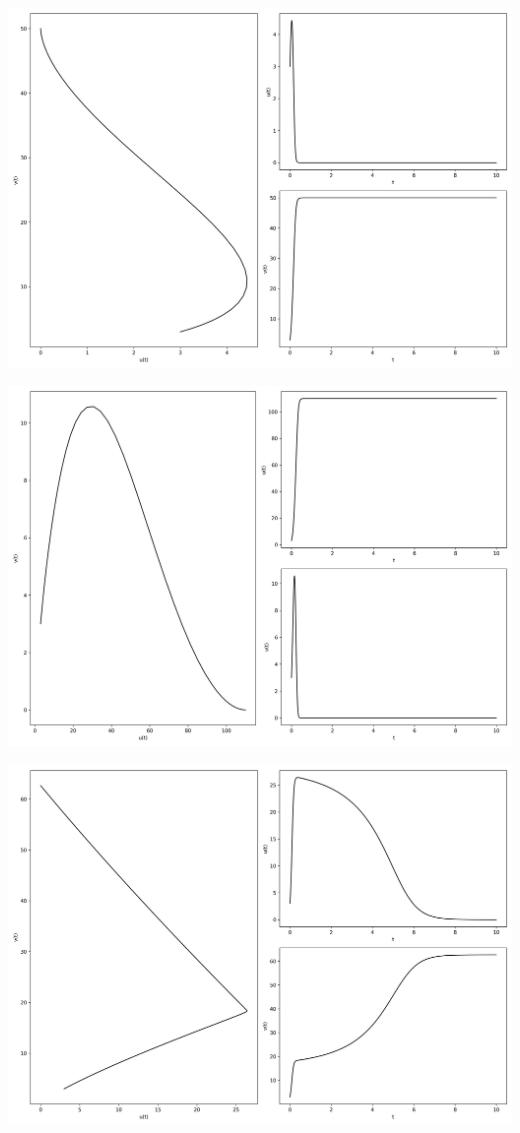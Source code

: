 \documentclass[12pt,a4paper]{jsarticle}
\makeatletter
\def\figcaption{\def\@captype{figure}\caption}
\makeatother
\begin{document}
\figcaption{$u_0=3.00, v_0=3.00, a_1=1.90, b_1=0.00, c_1=-1.90, a_2=1.90, b_2=0.00, c_2=1.90, T = 10, N = 1000$}
\includegraphics[scale=0.33]{u3,0v3,0a114,0b1-1,1c1-0,9a220,0b2-0,5c2-0,4t1,00e+01n1,00e+03.png}
\figcaption{$u_0=3.00, v_0=3.00, a_1=14.00, b_1=-1.10, c_1=-0.90, a_2=20.00, b_2=-0.50, c_2-=0.40, T = 10, N = 1000$}
\includegraphics[scale=0.33]{u3,0v3,0a122,0b1-0,2c1-0,4a217,0b2-0,5c2-0,3t1,00e+01n1,00e+03.png}
\figcaption{$u_0=3.00, v_0=3.00, a_1=22.00, b_1=-0.20, c_1=-0.40, a_2=17.00, b_2=-0.50, c_2=-0.30, T = 10, N = 1000$}
\includegraphics[scale=0.33]{u3,0v3,0a123,2b1-0,6c1-0,4a218,8b2-0,5c2-0,3t1,00e+01n1,00e+03.png}
\end{document}
